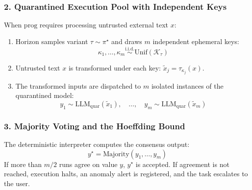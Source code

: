 \subsubsection{2. Quarantined Execution Pool with Independent Keys}
When $\mathrm{prog}$ requires processing untrusted external text $x$:
\begin{enumerate}
    \item Horizon samples variant $\tau \sim \pi^\star$ and draws $m$ independent ephemeral keys:
    \begin{equation}
        \kappa_1, \dots, \kappa_m \overset{\text{i.i.d.}}{\sim} \mathrm{Unif}(\mathcal{K}_\tau)
    \end{equation}
    \item Untrusted text $x$ is transformed under each key: $\tilde{x}_j = \tau_{\kappa_j}(x)$.
    \item The transformed inputs are dispatched to $m$ isolated instances of the quarantined model:
    \begin{equation}
        y_1 \sim \mathrm{LLM}_{\mathrm{quar}}(\tilde{x}_1), \quad \dots, \quad y_m \sim \mathrm{LLM}_{\mathrm{quar}}(\tilde{x}_m)
    \end{equation}
\end{enumerate}

\subsubsection{3. Majority Voting and the Hoeffding Bound}
The deterministic interpreter computes the consensus output:
\begin{equation}
    y^\star = \mathrm{Majority}(y_1, \dots, y_m)
\end{equation}
If more than $m/2$ runs agree on value $y$, $y^\star$ is accepted. If agreement is not reached, execution halts, an anomaly alert is registered, and the task escalates to the user.

